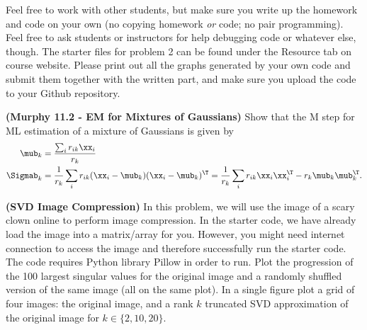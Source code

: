\documentclass[12pt,letterpaper,fleqn]{hmcpset}
\begin{document}
Feel free to work with other students, but make sure you write up the homework
and code on your own (no copying homework \textit{or} code; no pair programming).
Feel free to ask students or instructors for help debugging code or whatever else,
though.
\newline
\newline
The starter files for problem 2 can be found under the Resource tab on course website. Please print out all the graphs generated by your own code and submit them together with the written part, and make sure you upload the code to your Github repository.\\

\begin{problem}[1]
\textbf{(Murphy 11.2 - EM for Mixtures of Gaussians)} Show that the M step for ML
estimation of a mixture of Gaussians is given by
\begin{align*}
    \mub_k &= \frac{\sum_i r_{ik}\xx_i}{r_k}\\
    \Sigmab_k &= \frac{1}{r_k}\sum_i r_{ik}(\xx_i - \mub_k)(\xx_i - \mub_k)^\T = \frac{1}{r_k}\sum_i r_{ik}\xx_i\xx_i^\T - r_k\mub_k\mub_k^\T.
\end{align*}
\end{problem}
\begin{solution}
\vfill
\end{solution}
\newpage



\begin{problem}[2]
\textbf{(SVD Image Compression)}
In this problem, we will use the image of a scary clown online to perform image compression.  In the starter code, we have already load the image into a matrix/array for you. However, you might need internet connection to access the image and therefore successfully run the starter code. The code requires Python library Pillow in order to run.
\newline
\newline 
Plot the progression of the 100 largest singular values for the original image
and a randomly shuffled version of the same image (all on the same plot). In a single figure plot
a grid of four images: the original image, and a rank $k$ truncated SVD approximation of the original
image for $k\in\{2,10,20\}$.

\end{problem}
\begin{solution}
\vfill
\end{solution}
\newpage
\end{document}
